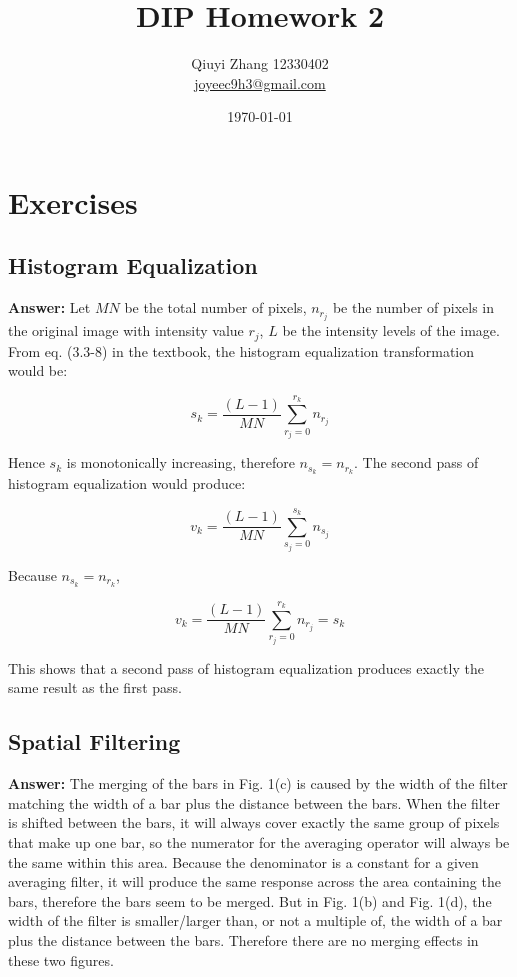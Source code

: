 \documentclass{article}
\begin{document}
\title{DIP Homework 2}
\author{Qiuyi Zhang 12330402 \\ \href{mailto:joyeec9h3@gmail.com}{joyeec9h3@gmail.com}} 
\date{\today}
\maketitle
\tableofcontents
\section{Exercises}

\subsection{Histogram Equalization}

\textbf{Answer:} 
Let $MN$ be the total number of pixels, $n_{r_j}$ be the number of pixels in the original image with intensity value $r_j$, $L$ be the intensity levels of the image. From eq. (3.3-8) in the textbook, the histogram equalization transformation would be:

$$s_k = \frac{(L-1)}{MN}\sum_{r_j=0}^{r_k}n_{r_j}$$

Hence $s_k$ is monotonically increasing, therefore $n_{s_k} = n_{r_k}$. The second pass of histogram equalization would produce:

$$v_k =  \frac{(L-1)}{MN}\sum_{s_j=0}^{s_k}n_{s_j}$$

Because $n_{s_k} = n_{r_k}$, 

$$v_k =  \frac{(L-1)}{MN}\sum_{r_j=0}^{r_k}n_{r_j} = s_k$$

This shows that a second pass of histogram equalization produces exactly the same result as the first pass.

\subsection{Spatial Filtering}

\textbf{Answer:}
The merging of the bars in Fig. 1(c) is caused by the width of the filter matching the width of a bar plus the distance between the bars. When the filter is shifted between the bars, it will always cover exactly the same group of pixels that make up one bar, so the numerator for the averaging operator will always be the same within this area. Because the denominator is a constant for a given averaging filter, it will produce the same response across the area containing the bars, therefore the bars seem to be merged. But in Fig. 1(b) and Fig. 1(d), the width of the filter is smaller/larger than, or not a multiple of, the width of a bar plus the distance between the bars. Therefore there are no merging effects in these two figures.
\end{document}
